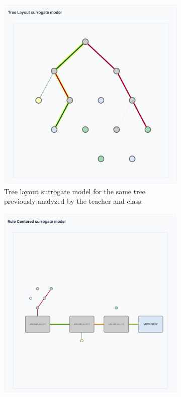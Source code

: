 \begin{figure}[ht]
    \centering
    \begin{subfigure}[c]{0.48\textwidth}
        \includegraphics[width=\textwidth]{images/teaching_classic_tree.png}
        \caption{Tree layout surrogate model for the same tree previously analyzed by the teacher and class.}
        \label{fig:teaching_classic_tree}
    \end{subfigure}
    \hfill
    \begin{subfigure}[c]{0.48\textwidth}
        \includegraphics[width=\textwidth]{images/teaching_spawn_tree.png}

\end{subfigure}
\end{figure}

